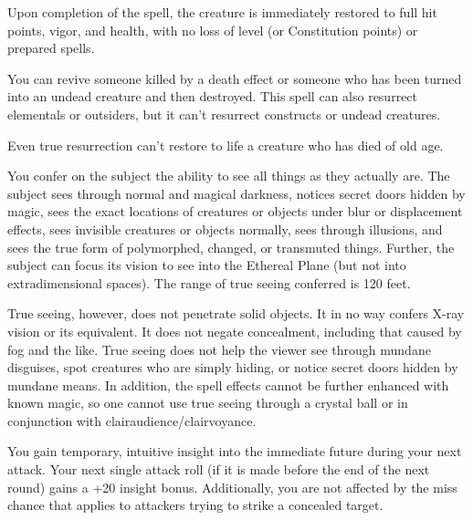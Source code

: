 \begin{multicols}{2}
\begin{small}
\smallskip\noindent Upon completion of the spell, the creature is immediately restored to full hit points, vigor, and health, with no loss of level (or Constitution points) or prepared spells.

\smallskip\noindent You can revive someone killed by a death effect or someone who has been turned into an undead creature and then destroyed. This spell can also resurrect elementals or outsiders, but it can't resurrect constructs or undead creatures.

\smallskip\noindent Even true resurrection can't restore to life a creature who has died of old age.


\noindent You confer on the subject the ability to see all things as they actually are. The subject sees through normal and magical darkness, notices secret doors hidden by magic, sees the exact locations of creatures or objects under blur or displacement effects, sees invisible creatures or objects normally, sees through illusions, and sees the true form of polymorphed, changed, or transmuted things. Further, the subject can focus its vision to see into the Ethereal Plane (but not into extradimensional spaces). The range of true seeing conferred is 120 feet.

\smallskip\noindent True seeing, however, does not penetrate solid objects. It in no way confers X-ray vision or its equivalent. It does not negate concealment, including that caused by fog and the like. True seeing does not help the viewer see through mundane disguises, spot creatures who are simply hiding, or notice secret doors hidden by mundane means. In addition, the spell effects cannot be further enhanced with known magic, so one cannot use true seeing through a crystal ball or in conjunction with clairaudience/clairvoyance.


\noindent You gain temporary, intuitive insight into the immediate future during your next attack. Your next single attack roll (if it is made before the end of the next round) gains a +20 insight bonus. Additionally, you are not affected by the miss chance that applies to attackers trying to strike a concealed target.


\end{small}
\end{multicols}
